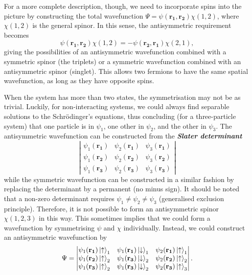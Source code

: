 \documentclass{article}
\newcommand{\up}{\ket{\uparrow}} %
\newcommand{\dn}{\ket{\downarrow}} %
\theoremstyle{nonumberplain}
\begin{document}
For a more complete description, though, we need to incorporate spins into the picture by constructing the total wavefunction $\Psi = \psi(\mathbf{r_1},\mathbf{r_2} ) \chi(1,2)$, where $\chi (1,2)$ is the general spinor. In this sense, the antisymmetric requirement becomes 
\[
    \psi (\mathbf{r_1}, \mathbf{r_2}  ) \chi (1,2) = - \psi (\mathbf{r_2}, \mathbf{r_1}  ) \chi (2,1),
\]
giving the possibilities of an antisymmetric wavefunction combined with a symmetric spinor (the triplets) or a symmetric wavefunction combined with an antisymmetric spinor (singlet). This allows two fermions to have the same spatial wavefunction, as long as they have opposite spins.  

When the system has more than two states, the symmetrisation may not be as trivial. Luckily, for non-interacting systems, we could always find separable solutions to the Schrödinger's equations, thus concluding (for a three-particle system) that one particle is in $\psi_1$, one other in $\psi_2 $, and the other in $\psi_3.$ The antisymmetric wavefunction can be constructed from the \textit{\textbf{Slater determinant}}
\[
    \left\vert  
    \begin{matrix}
        \psi_1 (\mathbf{r_1} ) & \psi_2 (\mathbf{r_1} ) & \psi_3(\mathbf{r_1} ) \\
        \psi_1 (\mathbf{r_2} ) & \psi_2 (\mathbf{r_2} ) & \psi_3(\mathbf{r_2} ) \\
        \psi_1 (\mathbf{r_3} ) & \psi_2 (\mathbf{r_3} ) & \psi_3(\mathbf{r_3} ) 
    \end{matrix} \right\vert
\] 
while the symmetric wavefunction can be constructed in a similar fashion by replacing the determinant by a permanent (no minus sign). It should be noted that a non-zero determinant requires $\psi_1 \neq \psi_2 \neq \psi_3 $ (generalised exclusion principle). Therefore, it is not possible to form an antisymmetric spinor $\chi(1,2,3)$ in this way. This sometimes implies that we could form a wavefunction by symmetrising $\psi$ and $\chi $ individually. Instead, we could construct an antisymmetric wavefunction by 
\[\Psi = 
    \left\vert 
    \begin{matrix}
        \psi_1(\mathbf{r_1} ) \up_1 & \psi_1(\mathbf{r_1} ) \dn_1 & \psi_2(\mathbf{r_1} ) \up_1 \\ 
        \psi_1(\mathbf{r_2} ) \up_2 & \psi_1(\mathbf{r_3} ) \dn_2 & \psi_2(\mathbf{r_2} ) \up_2 \\ 
        \psi_1(\mathbf{r_3} ) \up_2 & \psi_1(\mathbf{r_3} ) \dn_2 & \psi_2(\mathbf{r_3} ) \up_3 \\ 
    \end{matrix}
    \right\vert .
\]
\end{document}
